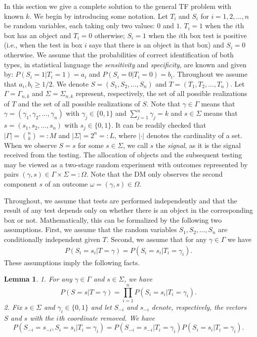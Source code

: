 \documentclass[a4paper,11pt]{article}
\newtheorem{lemma}{Lemma}
\begin{document}
In this section we give a complete solution to the general TF problem with known $k$. We begin by introducing some notation. Let $T_{i}$ and $S_{i}$ for $i=1,2,\dots,n$ be random variables, each taking only two values: $0$ and $1$. $T_{i}=1$ when the $i$th box has an object and $T_i=0$ otherwise; $S_{i}=1$ when the $i$th box test is positive (i.e., when the test in box $i$ says that there is an object in that box) and $S_i=0$ otherwise. We assume that the probabilities of correct identification of both types, in statistical language the \emph{sensitivity} and \emph{specificity}, are known and given by: $P(S_i=1|T_i=1)=a_i$ and $P(S_i=0|T_i=0)=b_i$. Throughout we assume that $a_i,b_i\ge1/2$. We denote $S=(S_1,S_2,\dots,S_n)$ and $T=(T_1,T_2,\dots,T_n)$. Let $\Gamma = \Gamma_{n,k}$ and $\Sigma=\Sigma_{n,k}$ represent, respectively, the set of all possible realizations of $T$ and the set of all possible realizations of $S$. Note that $\gamma\in\Gamma$ means that $\gamma=(\gamma_{1},\gamma_{2},\dots,\gamma_{n})$ with $\gamma_j\in\{0,1\}$ and $\sum_{j=1}^n \gamma_j=k$ and $s\in\Sigma$ means that $s=(s_{1},s_{2},\dots,s_{n})$ with $s_j\in\{0,1\}$. It can be readily checked that $|\Gamma|= \binom{n}{k}=:M$ and $|\Sigma|= 2^n=:L$, where $|\cdot|$ denotes the cardinality of a set. When we observe $S=s$ for some $s\in\Sigma$, we call $s$ the \emph{signal}, as it is the signal received from the testing. The allocation of objects and the subsequent testing may be viewed as a two-stage random experiment with outcomes represented by pairs $(\gamma ,s)\in\Gamma\times\Sigma=:\Omega$. Note that the DM only observes the second component $s$ of an outcome $\omega=(\gamma,s)\in\Omega$.

Throughout, we assume that tests are performed independently and that the result of any test depends only on whether there is an object in the corresponding box or not. Mathematically, this can be formalized by the following two assumptions. First, we assume that the random variables $S_1,S_2,\dots,S_n$ are conditionally independent given $T$. Second, we assume that for any $\gamma\in\Gamma$ we have
\begin{eqnarray}\label{eq: cond on T}
P(S_i=s_i |T=\gamma) = P(S_i=s_i|T_i = \gamma_i).
\end{eqnarray}
These assumptions imply the following facts.

\begin{lemma}\label{lemma: cond indep}
1. For any $\gamma\in\Gamma$ and $s\in\Sigma$, we have
$$
P(S=s|T=\gamma) = \prod_{i=1}^n P(S_i=s_i|T_i=\gamma_i).
$$
2. Fix $s\in\Sigma$ and $\gamma_i\in\{0,1\}$ and let $S_{-i}$ and $s_{-i}$ denote, respectively, the vectors $S$ and $s$ with the $i$th coordinate removed. We have
$$
P(S_{-i}=s_{-i}, S_i=s_i|T_i=\gamma_i) = P(S_{-i}=s_{-i}|T_i=\gamma_i) P(S_i=s_i|T_i=\gamma_i).
$$
\end{lemma}
\end{document}
